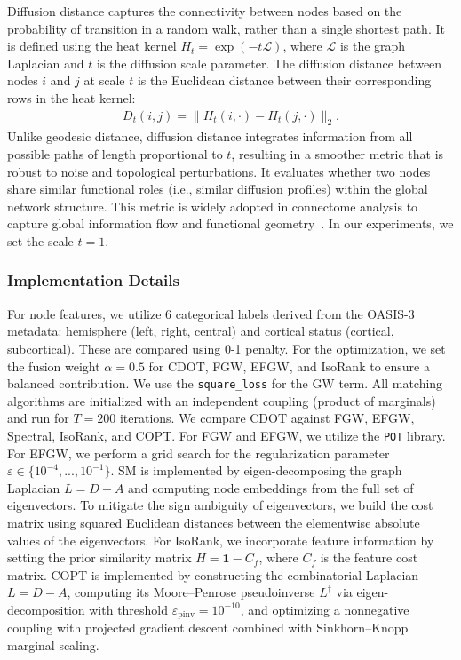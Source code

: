 \documentclass{article}
\theoremstyle{plain}
\theoremstyle{definition}
\theoremstyle{remark}
\begin{document}
Diffusion distance captures the connectivity between nodes based on the probability of transition in a random walk, rather than a single shortest path. It is defined using the heat kernel $H_t = \exp(-t \mathcal{L})$, where $\mathcal{L}$ is the graph Laplacian and $t$ is the diffusion scale parameter. The diffusion distance between nodes $i$ and $j$ at scale $t$ is the Euclidean distance between their corresponding rows in the heat kernel:
\begin{align*}
	D_t(i, j) = \| H_t(i, \cdot) - H_t(j, \cdot) \|_2.
\end{align*}
Unlike geodesic distance, diffusion distance integrates information from all possible paths of length proportional to $t$, resulting in a smoother metric that is robust to noise and topological perturbations. It evaluates whether two nodes share similar functional roles (i.e., similar diffusion profiles) within the global network structure. This metric is widely adopted in connectome analysis to capture global information flow and functional geometry~\citep{coifman2006diffusion, abdelnour2014network}. In our experiments, we set the scale $t=1$.

\subsubsection{Implementation Details}

For node features, we utilize 6 categorical labels derived from the OASIS-3 metadata: hemisphere (left, right, central) and cortical status (cortical, subcortical). These are compared using 0-1 penalty. For the optimization, we set the fusion weight $\alpha = 0.5$ for CDOT, FGW, EFGW, and IsoRank to ensure a balanced contribution. We use the \texttt{square\_loss} for the GW term. All matching algorithms are initialized with an independent coupling (product of marginals) and run for $T=200$ iterations. We compare CDOT against FGW, EFGW, Spectral, IsoRank, and COPT. For FGW and EFGW, we utilize the \texttt{POT} library. For EFGW, we perform a grid search for the regularization parameter $\varepsilon \in \{10^{-4}, ..., 10^{-1}\}$. SM is implemented by eigen-decomposing the graph Laplacian $L=D-A$ and computing node embeddings from the full set of eigenvectors. To mitigate the sign ambiguity of eigenvectors, we build the cost matrix using squared Euclidean distances between the elementwise absolute values of the eigenvectors. For IsoRank, we incorporate feature information by setting the prior similarity matrix $H=\mathbf{1}-C_f$, where $C_f$ is the feature cost matrix. COPT is implemented by constructing the combinatorial Laplacian $L=D-A$, computing its Moore--Penrose pseudoinverse $L^\dagger$ via eigen-decomposition with threshold $\varepsilon_{\mathrm{pinv}}=10^{-10}$, and optimizing a nonnegative coupling with projected gradient descent combined with Sinkhorn--Knopp marginal scaling.
\end{document}
